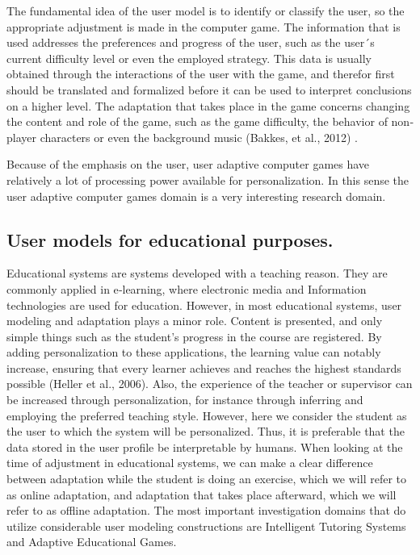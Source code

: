 The fundamental idea of the user model is to identify or classify the user, so
the appropriate adjustment is made in the computer game. The information that is
used addresses the preferences and progress of the user, such as the user´s
current  difficulty level or even the employed strategy. This data is usually
obtained through the interactions of  the user with the game, and therefor first
should be translated and formalized  before it can be  used to interpret
conclusions on a higher level. The adaptation that takes place in the game
concerns changing the content and role of the  game, such as the game
difficulty, the behavior of non‐player characters  or even the background  music
(Bakkes, et al., 2012) .

Because of the emphasis on the user, user adaptive computer games have
relatively a lot of processing power available  for personalization. In this
sense the user adaptive computer games domain is a very interesting research
domain.


\subsection{User models for educational purposes.}

Educational systems are systems developed with a teaching reason. They are
commonly applied in e‐learning,  where electronic media and Information
technologies are used for education. However, in most educational systems,  user
modeling and adaptation plays a minor role. Content is presented, and only
simple things such as the student’s progress in the course are registered. By
adding personalization to these applications, the learning value can notably
increase, ensuring that every learner achieves and reaches the highest standards
possible (Heller et al., 2006). Also, the experience of the teacher or
supervisor can be increased through personalization, for instance through
inferring and employing the preferred teaching style. However, here we consider
the student as the user to which the system will be personalized. Thus, it is
preferable that the data stored in the user profile be interpretable by humans.
When looking at the time of adjustment in educational systems, we can make a
clear difference between adaptation while the student is doing an exercise,
which we will refer to as online adaptation, and adaptation that takes place
afterward, which we will refer to as offline adaptation. The most important
investigation domains that do utilize considerable user modeling constructions
are Intelligent  Tutoring Systems and Adaptive Educational Games.

